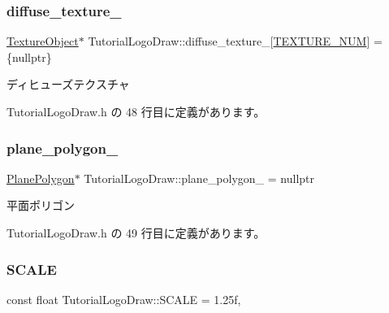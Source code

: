 \subsubsection{\texorpdfstring{diffuse\+\_\+texture\+\_\+}{diffuse\_texture\_}}
{\footnotesize\ttfamily \mbox{\hyperlink{class_texture_object}{Texture\+Object}}$\ast$ Tutorial\+Logo\+Draw\+::diffuse\+\_\+texture\+\_\+\mbox{[}\mbox{\hyperlink{class_tutorial_logo_draw_aff3396323c386d499aa23e5605085ab1}{T\+E\+X\+T\+U\+R\+E\+\_\+\+N\+UM}}\mbox{]} = \{nullptr\}\hspace{0.3cm}{\ttfamily [private]}}



ディヒューズテクスチャ 



 Tutorial\+Logo\+Draw.\+h の 48 行目に定義があります。

\mbox{\label{class_tutorial_logo_draw_adc447c252db2d9ab17d72eb783d82432}} 
\subsubsection{\texorpdfstring{plane\+\_\+polygon\+\_\+}{plane\_polygon\_}}
{\footnotesize\ttfamily \mbox{\hyperlink{class_plane_polygon}{Plane\+Polygon}}$\ast$ Tutorial\+Logo\+Draw\+::plane\+\_\+polygon\+\_\+ = nullptr\hspace{0.3cm}{\ttfamily [private]}}



平面ポリゴン 



 Tutorial\+Logo\+Draw.\+h の 49 行目に定義があります。

\mbox{\label{class_tutorial_logo_draw_adb1a43e53dcacfc06835d8a1cc85e324}} 
\subsubsection{\texorpdfstring{S\+C\+A\+LE}{SCALE}}
{\footnotesize\ttfamily const float Tutorial\+Logo\+Draw\+::\+S\+C\+A\+LE = 1.\+25f\hspace{0.3cm}{\ttfamily [static]}, {\ttfamily [private]}}




